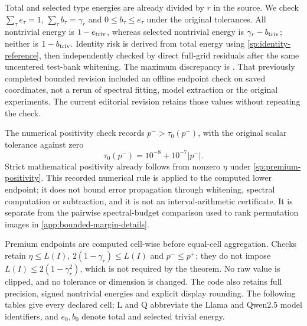Total and selected type energies are already divided by $r$ in the source. We check $\sum_\tau e_\tau=1$, $\sum_\tau b_\tau=\gamma_r$ and $0\le b_\tau\le e_\tau$ under the original tolerances. All nontrivial energy is $1-e_{\rm triv}$, whereas selected nontrivial energy is $\gamma_r-b_{\rm triv}$; neither is $1-b_{\rm triv}$. Identity risk is derived from total energy using \cref{sp:identity-reference}, then independently checked by direct full-grid residuals after the same uncentered test-bank whitening. The maximum discrepancy is \BoundedIdentityMaxError. That previously completed bounded revision included an offline endpoint check on saved coordinates, not a rerun of spectral fitting, model extraction or the original experiments. The current editorial revision retains those values without repeating the check.

The numerical positivity check records $p^->\tau_0(p^-)$, with the original scalar tolerance against zero
\[
 \tau_0(p^-)=10^{-8}+10^{-7}|p^-|.
\]
Strict mathematical positivity already follows from nonzero $\eta$ under \cref{sp:premium-positivity}. This recorded numerical rule is applied to the computed lower endpoint; it does not bound error propagation through whitening, spectral computation or subtraction, and it is not an interval-arithmetic certificate. It is separate from the pairwise spectral-budget comparison used to rank permutation images in \cref{app:bounded-margin-details}.

Premium endpoints are computed cell-wise before equal-cell aggregation. Checks retain $\eta\le L(I)$, $2(1-\gamma_r)\le L(I)$ and $p^-\le p^+$; they do not impose $L(I)\le2(1-\gamma_r^2)$, which is not required by the theorem. No raw value is clipped, and no tolerance or dimension is changed. The code also retains full precision, signed nontrivial energies and explicit display rounding. The following tables give every declared cell; L and Q abbreviate the Llama and Qwen2.5 model identifiers, and $e_0,b_0$ denote total and selected trivial energy.

